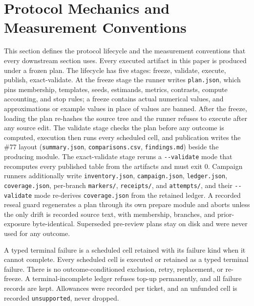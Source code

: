 \section{Protocol Mechanics and Measurement Conventions}
\label{sec:app:protocol}

This section defines the protocol lifecycle and the measurement conventions that every downstream section uses.
Every executed artifact in this paper is produced under a frozen plan. The lifecycle has five stages: freeze, validate, execute, publish, exact-validate. At the freeze stage the runner writes \texttt{plan.json}, which pins membership, templates, seeds, estimands, metrics, contrasts, compute accounting, and stop rules; a freeze contains actual numerical values, and approximations or example values in place of values are banned. After the freeze, loading the plan re-hashes the source tree and the runner refuses to execute after any source edit. The validate stage checks the plan before any outcome is computed, execution then runs every scheduled cell, and publication writes the \#77 layout (\texttt{summary.json}, \texttt{comparisons.csv}, \texttt{findings.md}) beside the producing module. The exact-validate stage reruns a \texttt{-{}-validate} mode that recomputes every published table from the artifacts and must exit 0.  Campaign runners additionally write \texttt{inventory.json}, \texttt{campaign.json}, \texttt{ledger.json}, \texttt{coverage.json}, per-branch \texttt{markers/}, \texttt{receipts/}, and \texttt{attempts/}, and their \texttt{-{}-validate} mode re-derives \texttt{coverage.json} from the retained ledger. A recorded reseal guard regenerates a plan through its own prepare module and aborts unless the only drift is recorded source text, with membership, branches, and prior-exposure byte-identical. Superseded pre-review plans stay on disk and were never used for any outcome.

A typed terminal failure is a scheduled cell retained with its failure kind when it cannot complete. Every scheduled cell is executed or retained as a typed terminal failure. There is no outcome-conditioned exclusion, retry, replacement, or re-freeze. A terminal-incomplete ledger refuses top-up permanently, and all failure records are kept. Allowances were recorded per ticket, and an unfunded cell is recorded \texttt{unsupported}, never dropped.

